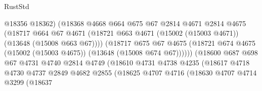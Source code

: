 \begin{lexlean}{RustStd}
\begin{coremodule}
                                      @18356
                                      @18362)
                                    (@18368
                                      @4668
                                      @664
                                      @675
                                      @67
                                      @2814
                                      @4671
                                      @2814
                                      @4675
                                      (@18717
                                        @664
                                        @67
                                        @4671
                                        (@18721
                                          @663
                                          @4671
                                          (@15002 (@15003 @4671))
                                          (@13648 (@15008 @663 @67))))
                                      (@18717
                                        @675
                                        @67
                                        @4675
                                        (@18721
                                          @674
                                          @4675
                                          (@15002 (@15003 @4675))
                                          (@13648 (@15008 @674 @67))))))
                                  (@18600
                                    @687
                                    @698
                                    @67
                                    @4731
                                    @4740
                                    @2814
                                    @4749
                                    (@18610
                                      @4731
                                      @4738
                                      @4235
                                      (@18617
                                        @4718
                                        @4730
                                        @4737
                                        @2849
                                        @4682
                                        @2855
                                        (@18625
                                          @4707
                                          @4716
                                          (@18630
                                            @4707
                                            @4714
                                            @3299
                                            (@18637

\end{coremodule}
\end{lexlean}
